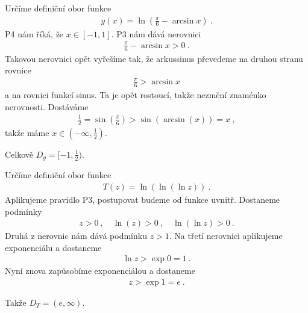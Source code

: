 \begin{example}
    Určíme definiční obor funkce \begin{align}
        y(x) = \ln \left( \frac{\pi}{6} - \arcsin x \right) \:.
    \end{align}
    P4 nám říká, že $x \in [-1,1]$. P3 nám dává nerovnici \begin{align}
        \frac{\pi}{6} - \arcsin x > 0 \:.
    \end{align}
    Takovou nerovnici opět vyřešíme tak, že arkussinus převedeme na druhou stranu rovnice
    \begin{align}
        \frac{\pi}{6} > \arcsin x
    \end{align}
    a na rovnici  funkcí sinus. Ta je opět rostoucí, takže nezmění znaménko nerovnosti. Dostáváme
    \begin{align}
        \frac{1}{2} = \sin \left( \frac{\pi}{6} \right)  > \sin (\arcsin(x)) = x \:,
    \end{align}
    takže máme $x \in (-\infty, \frac{1}{2})$.

    Celkově $D_y = [-1,\frac{1}{2})$.
\end{example}

\begin{example}[Náročnější]
    Určíme definiční obor funkce \begin{align}
        T(z) = \ln \left(\ln(\ln z) \right) \:.
    \end{align}
    Aplikujeme pravidlo P3, postupovat budeme od funkce uvnitř. Dostaneme podmínky \begin{align}
        z > 0 \:, \quad \ln (z) > 0 \:, \quad \ln (\ln z) > 0 \:.
    \end{align}
    Druhá z nerovnic nám dává podmínku $z > 1$. Na třetí nerovnici aplikujeme exponenciálu a dostaneme \begin{align}
        \ln z > \exp 0 = 1 \:.
    \end{align}
    Nyní znova zapůsobíme exponenciálou a dostaneme \begin{align}
        z >  \exp 1 = e \:.
    \end{align}

    Takže $D_T = (e, \infty)$.
\end{example}

